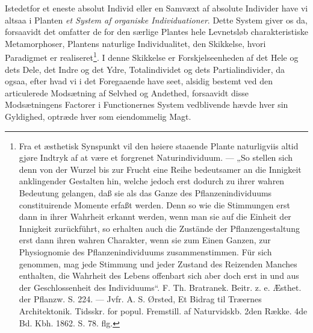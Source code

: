 \documentclass[11pt]{book}
\newcommand{\opage}[1]{\marginnote{\footnotesize\textit{[#1]}}}
\begin{document}
\opage{317} \setcounter{footnote}{0}%
Istedetfor et eneste absolut Individ eller en Samvæxt af absolute
Individer have vi altsaa i Planten \emph{et System af organiske
Individuationer}. Dette System giver os da, forsaavidt det omfatter de
for den særlige Plantes hele Levnetsløb charakteristiske
Metamorphoser, Plantens naturlige Individualitet, den Skikkelse, hvori
Paradigmet er realiseret\footnote{Fra et æsthetisk Synspunkt vil den
høiere staaende Plante naturligviis altid gjøre Indtryk af at være et
forgrenet Naturindividuum. --- „So stellen sich denn von der Wurzel
bis zur Frucht eine Reihe bedeutsamer an die Innigkeit anklingender
Gestalten hin, welche jedoch erst dodurch zu ihrer wahren Bedeutung
gelangen, daß sie als das Ganze des Pflanzenindividuums
constituirende Momente erfaßt werden. Denn so wie die Stimmungen
erst dann in ihrer Wahrheit erkannt werden, wenn man sie auf die
Einheit der Innigkeit zurückführt, so erhalten auch die Zustände der
Pflanzengestaltung erst dann ihren wahren Charakter, wenn sie zum
Einen Ganzen, zur Physiognomie des Pflanzenindividuums
zusammenstimmen. Für sich genommen, mag jede Stimmung und
jeder Zustand des Reizenden Manches enthalten, die Wahrheit des
Lebens offenbart sich aber doch erst in und aus der Geschlossenheit
des Individuums“. F. Th. Bratranek. Beitr. z. e. Æsthet. der
Pflanzw. S. 224. --- Jvfr. A. S. Ørsted, Et Bidrag til Træernes
Architektonik. Tidsskr. for popul. Fremstill. af Naturvidskb. 2den
Række. 4de Bd. Kbh. 1862. S. 78. flg.}. I denne Skikkelse er
Forskjelseenheden af det Hele og dets Dele, det Indre og det Ydre,
Totalindividet og dets Partialindivider, da ogsaa, efter hvad vi i det
Foregaaende have seet, alsidig bestemt ved den articulerede Modsætning
af Selvhed og Andethed, forsaavidt disse Modsætningens Factorer i
Functionernes System vedblivende hævde hver sin Gyldighed, optræde
hver som eiendommelig Magt.
\end{document}
